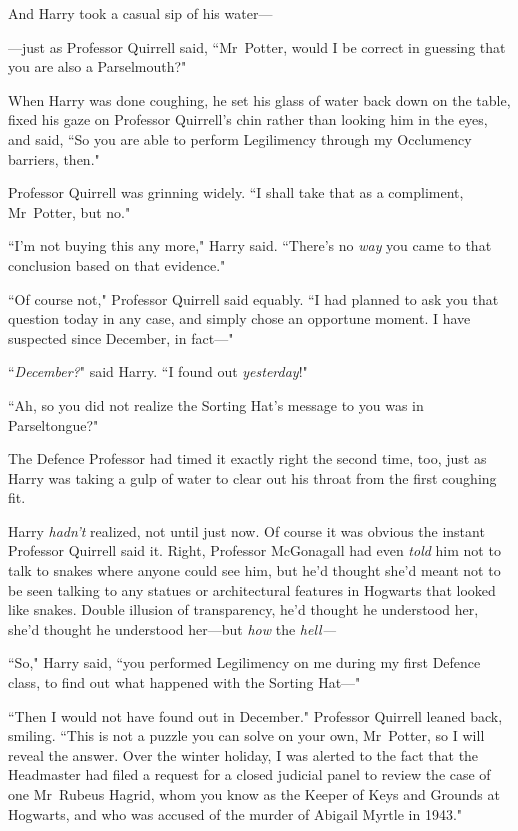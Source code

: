 And Harry took a casual sip of his water—

—just as Professor Quirrell said, ``Mr~Potter, would I be correct in guessing that you are also a Parselmouth?"

When Harry was done coughing, he set his glass of water back down on the table, fixed his gaze on Professor Quirrell's chin rather than looking him in the eyes, and said, ``So you are able to perform Legilimency through my Occlumency barriers, then."

Professor Quirrell was grinning widely. ``I shall take that as a compliment, Mr~Potter, but no."

``I'm not buying this any more," Harry said. ``There's no \emph{way} you came to that conclusion based on that evidence."

``Of course not," Professor Quirrell said equably. ``I had planned to ask you that question today in any case, and simply chose an opportune moment. I have suspected since December, in fact—"

``\emph{December?}" said Harry. ``I found out \emph{yesterday}!"

``Ah, so you did not realize the Sorting Hat's message to you was in Parseltongue?"

The Defence Professor had timed it exactly right the second time, too, just as Harry was taking a gulp of water to clear out his throat from the first coughing fit.

Harry \emph{hadn't} realized, not until just now. Of course it was obvious the instant Professor Quirrell said it. Right, Professor McGonagall had even \emph{told} him not to talk to snakes where anyone could see him, but he'd thought she'd meant not to be seen talking to any statues or architectural features in Hogwarts that looked like snakes. Double illusion of transparency, he'd thought he understood her, she'd thought he understood her—but \emph{how} the \emph{hell—}

``So," Harry said, ``you performed Legilimency on me during my first Defence class, to find out what happened with the Sorting Hat—"

``Then I would not have found out in December." Professor Quirrell leaned back, smiling. ``This is not a puzzle you can solve on your own, Mr~Potter, so I will reveal the answer. Over the winter holiday, I was alerted to the fact that the Headmaster had filed a request for a closed judicial panel to review the case of one Mr~Rubeus Hagrid, whom you know as the Keeper of Keys and Grounds at Hogwarts, and who was accused of the murder of Abigail Myrtle in 1943."

